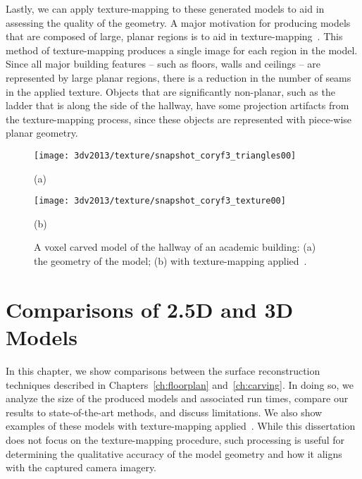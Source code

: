 \documentclass[12pt,onecolumn,oneside]{book}
\begin{document}
Lastly, we can apply texture-mapping to these generated models to aid in assessing the quality of the geometry.  A major motivation for producing models that are composed of large, planar regions is to aid in texture-mapping~\cite{Cheng13}.  This method of texture-mapping produces a single image for each region in the model.  Since all major building features -- such as floors, walls and ceilings -- are represented by large planar regions, there is a reduction in the number of seams in the applied texture.  Objects that are significantly non-planar, such as the ladder that is along the side of the hallway, have some projection artifacts from the texture-mapping process, since these objects are represented with piece-wise planar geometry.

\begin{figure}[t]

	\centering
	\begin{minipage}[b]{0.95\linewidth}
	\centerline{\texttt{[image: 3dv2013/texture/snapshot\_coryf3\_triangles00]}}
	\centerline{(a)}
	\end{minipage}
	\hfill
	\begin{minipage}[b]{0.95\linewidth}
	\centerline{\texttt{[image: 3dv2013/texture/snapshot\_coryf3\_texture00]}}
	\centerline{(b)}
	\end{minipage}

	\caption[Texture-mapping applied to voxel carving result.]{A voxel carved model of the hallway of an academic building: (a) the geometry of the model; (b) with texture-mapping applied~\cite{Cheng13}.}
	\label{fig:3dv2013_bhh_hallway}
\end{figure}


\chapter{Comparisons of 2.5D and 3D Models}
\label{ch:fp_carving_compare}

In this chapter, we show comparisons between the surface reconstruction techniques described in Chapters~\ref{ch:floorplan} and~\ref{ch:carving}.  In doing so, we analyze the size of the produced models and associated run times, compare our results to state-of-the-art methods, and discuss limitations.  We also show examples of these models with texture-mapping applied~\cite{Cheng14,Turner14Journal}.  While this dissertation does not focus on the texture-mapping procedure, such processing is useful for determining the qualitative accuracy of the model geometry and how it aligns with the captured camera imagery.
\end{document}
